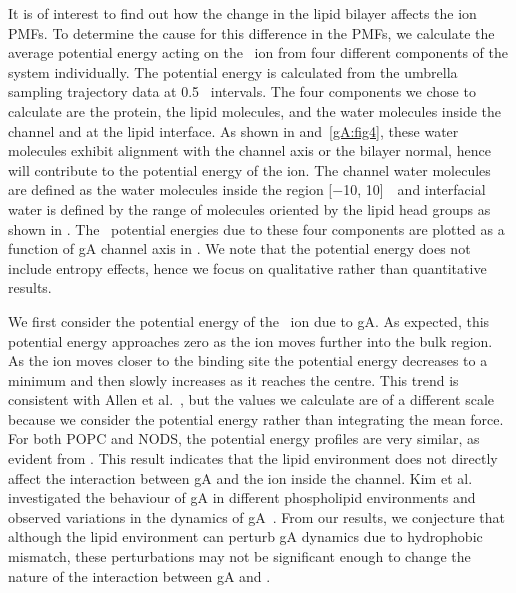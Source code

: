 It is of interest to find out how the change in the lipid bilayer affects the ion PMFs. To determine
the cause for this difference in the PMFs, we calculate the average potential energy acting on the 
\K\ ion from four different components of the system individually. The potential energy is calculated 
from the umbrella sampling trajectory data at 0.5 \angs\ intervals. The four components we chose to 
calculate are the protein, the lipid molecules, and the water molecules inside the channel and at the 
lipid interface. As shown in  and~\ref{gA:fig4}, these water molecules exhibit 
alignment with the channel axis or the bilayer normal, hence will contribute to the potential energy 
of the ion. The channel water molecules are defined as the water molecules inside the region 
[$-$10, 10]~\angs\ and interfacial water is defined by the range of molecules oriented by the lipid 
head groups as shown in . The \K\ potential energies due to these four components 
are plotted as a function of gA channel axis in . We note that the potential energy 
does not include entropy effects, hence we focus on qualitative rather than quantitative results.

We first consider the potential energy of the \K\ ion due to gA. As expected, this potential energy
approaches zero as the ion moves further into the bulk region. As the ion moves closer to the binding 
site the potential energy decreases to a minimum and then slowly increases as it reaches the centre. 
This trend is consistent with Allen et al.~\cite{Allen2004}, but the values we calculate are of a 
different scale because we consider the potential energy rather than integrating the mean force. 
For both POPC and NODS, the potential energy profiles are very similar, as evident from . 
This result indicates that the lipid environment does not directly affect the interaction between gA 
and the ion inside the channel. Kim et al. investigated the behaviour of gA in different phospholipid 
environments and observed variations in the dynamics of gA~\cite{Kim2012}. From our results, we 
conjecture that although the lipid environment can perturb gA dynamics due to hydrophobic mismatch, 
these perturbations may not be significant enough to change the nature of the interaction between gA 
and \K.

